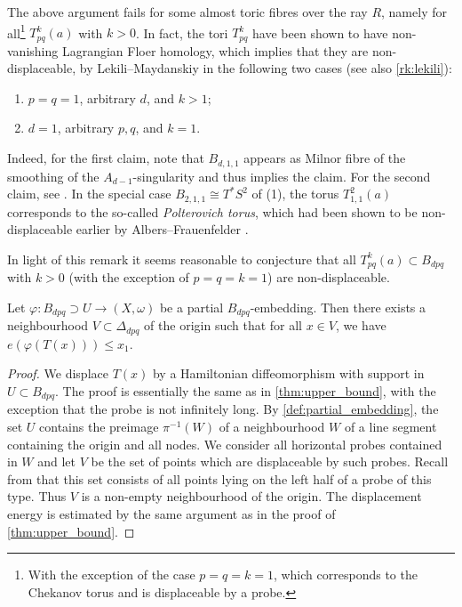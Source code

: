 \documentclass[12pt,a4paper,abstract=true,draft]{scrartcl}
\begin{document}
\begin{remark}
    \label{rk:nondisplaceable}
    The above argument fails for some almost toric fibres over the ray $R$, namely for all\footnote{With the exception of the case $p=q=k=1$, which corresponds to the Chekanov torus and is displaceable by a probe.} $T^k_{pq}(a)$ with $k > 0$.
In fact, the tori $T^k_{pq}$ have been shown to have non-vanishing Lagrangian Floer homology, which implies that they are non-displaceable, by Lekili--Maydanskiy \cite{LekMay14} in the following two cases (see also \cref{rk:lekili}):
    \begin{enumerate}
        \item $p = q = 1$, arbitrary $d$, and $k > 1$;
        \item $d = 1$, arbitrary $p,q$, and $k = 1$.
    \end{enumerate}
    Indeed, for the first claim, note that $B_{d,1,1}$ appears as Milnor fibre of the smoothing of the $A_{d-1}$-singularity and thus \cite[Proposition 2.20]{LekMay14} implies the claim.
For the second claim, see \cite[Proposition 3.6]{LekMay14}.
In the special case $B_{2,1,1} \cong T^*S^2$ of (1), the torus $T_{1,1}^2(a)$ corresponds to the so-called \emph{Polterovich torus}, which had been shown to be non-displaceable earlier by Albers--Frauenfelder \cite{AlbFra08}.
\end{remark}

In light of this remark it seems reasonable to conjecture that all $T^k_{pq}(a) \subset B_{dpq}$ with $k > 0$ (with the exception of $p=q=k=1$) are non-displaceable.


\begin{proposition}
\label{thm:upper_bound_embedded}
  Let $φ\colon B_{dpq} ⊃ U → (X,ω)$ be a partial $B_{dpq}$-embedding.
Then there exists a neighbourhood $V \subset \Delta_{dpq}$ of the origin such that for all $x \in V$, we have $e(φ(T(x))) \leq x_1$.
\end{proposition}

\begin{proof}
    We displace $T(x)$ by a Hamiltonian diffeomorphism with support in $U \subset B_{dpq}$.
The proof is essentially the same as in \cref{thm:upper_bound}, with the exception that the probe is not infinitely long.
By \cref{def:partial_embedding}, the set $U$ contains the preimage $\pi^{-1}(W)$ of a neighbourhood $W$ of a line segment containing the origin and all nodes.
We consider all horizontal probes contained in $W$ and let $V$ be the set of points which are displaceable by such probes.
Recall from \cite[Section 2.1]{mcduff2011displacing} that this set consists of all points lying on the left half of a probe of this type.
Thus $V$ is a non-empty neighbourhood of the origin.
The displacement energy is estimated by the same argument as in the proof of \cref{thm:upper_bound}.
\end{proof}
\end{document}
